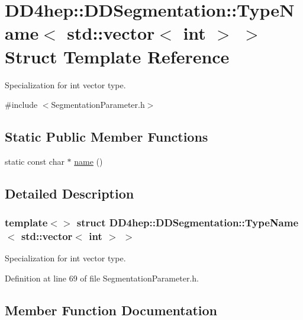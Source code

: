 \hypertarget{struct_d_d4hep_1_1_d_d_segmentation_1_1_type_name_3_01std_1_1vector_3_01int_01_4_01_4}{}\section{D\+D4hep\+:\+:D\+D\+Segmentation\+:\+:Type\+Name$<$ std\+:\+:vector$<$ int $>$ $>$ Struct Template Reference}
\label{struct_d_d4hep_1_1_d_d_segmentation_1_1_type_name_3_01std_1_1vector_3_01int_01_4_01_4}


Specialization for int vector type.  




{\ttfamily \#include $<$Segmentation\+Parameter.\+h$>$}

\subsection*{Static Public Member Functions}
\begin{DoxyCompactItemize}
\item 
static const char $\ast$ \hyperlink{struct_d_d4hep_1_1_d_d_segmentation_1_1_type_name_3_01std_1_1vector_3_01int_01_4_01_4_a999a3441d585396df6bd32400a99a3e5}{name} ()
\end{DoxyCompactItemize}


\subsection{Detailed Description}
\subsubsection*{template$<$$>$\newline
struct D\+D4hep\+::\+D\+D\+Segmentation\+::\+Type\+Name$<$ std\+::vector$<$ int $>$ $>$}

Specialization for int vector type. 

Definition at line 69 of file Segmentation\+Parameter.\+h.



\subsection{Member Function Documentation}
\hypertarget{struct_d_d4hep_1_1_d_d_segmentation_1_1_type_name_3_01std_1_1vector_3_01int_01_4_01_4_a999a3441d585396df6bd32400a99a3e5}{}\label{struct_d_d4hep_1_1_d_d_segmentation_1_1_type_name_3_01std_1_1vector_3_01int_01_4_01_4_a999a3441d585396df6bd32400a99a3e5} 
